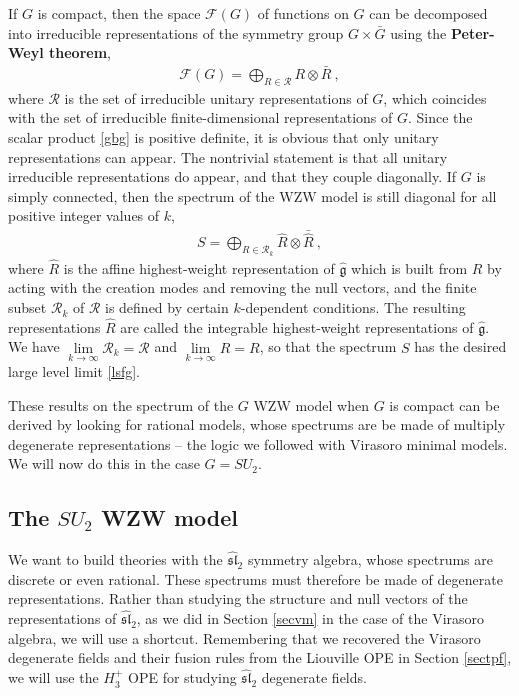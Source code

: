 \documentclass[12pt, a4paper, notitlepage, twoside]{report}
\numberwithin{equation}{section}
\theoremstyle{break}
\begin{document}
If $G$ is compact, then the space $\mathcal{F}(G)$ of functions on $G$ can be decomposed into irreducible representations of the symmetry group $G\times \bar{G}$ using the \textbf{\boldmath Peter-Weyl theorem}, 
\begin{align}
 \mathcal{F}(G) = \bigoplus_{R\in \mathcal{R}} R\otimes \bar{R}\ ,
\end{align}
where $\mathcal{R}$ is the set of irreducible unitary representations of $G$, which coincides with the set of irreducible finite-dimensional representations of $G$.
Since the scalar product \eqref{gbg} is positive definite, it is obvious that only unitary representations can appear.
The nontrivial statement is that all unitary irreducible representations do appear, and that they couple diagonally. 
If $G$ is simply connected, then the spectrum of the WZW model is still diagonal for all positive integer values of $k$, \cite{fms97}
\begin{align}
 S = \bigoplus_{R\in \mathcal{R}_k} \hat{R}\otimes \bar{\hat{R}}\ ,
\end{align}
where $\hat{R}$ is the affine highest-weight representation of $\hat{\mathfrak{g}}$ which is built from $R$ by acting with the creation modes and removing the null vectors, and the finite subset $\mathcal{R}_k$ of $\mathcal{R}$ is defined by certain $k$-dependent conditions.
The resulting representations $\hat{R}$ are called the integrable highest-weight representations of $\hat{\mathfrak{g}}$. 
We have $\underset{k\to\infty}{\lim} \mathcal{R}_k =\mathcal{R}$ and $\underset{k\to \infty}{\lim} \hat{R} = R$, so that the spectrum $S$ has the desired large level limit \eqref{lsfg}.

These results on the spectrum of the $G$ WZW model when $G$ is compact can be derived by looking for rational models, whose spectrums are be made of multiply degenerate representations -- the logic we followed with Virasoro minimal models.
We will now do this in the case $G=SU_2$.   


\subsection{The \texorpdfstring{$SU_2$}{SU(2)} WZW model \label{secsu}}

We want to build theories with the $\widehat{\mathfrak{sl}}_2$ symmetry algebra, whose spectrums are discrete or even rational.
These spectrums must therefore be made of degenerate representations.
Rather than studying the structure and null vectors of the representations of $\widehat{\mathfrak{sl}}_2$, as we did in Section \ref{secvm} in the case of the Virasoro algebra, 
we will use a shortcut.
Remembering that we recovered
the Virasoro degenerate fields and their fusion rules from the Liouville OPE in Section \ref{sectpf},
we will use the $H_3^+$ OPE for studying $\widehat{\mathfrak{sl}}_2$ degenerate fields. 
\end{document}
